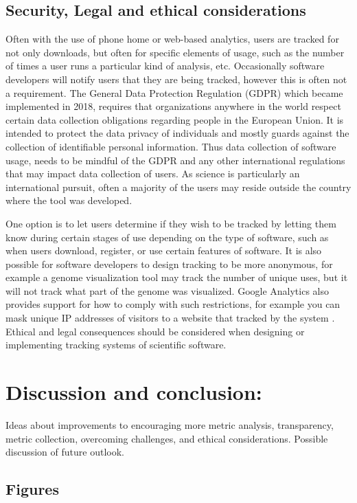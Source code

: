\documentclass{article}
\begin{document}
\subsection{Security, Legal and ethical considerations}\label{sec:legal_ethics}
Often with the use of phone home or web-based analytics, users are tracked for not only downloads, but often for specific elements of usage, such as the number of times a user runs a particular kind of analysis, etc. Occasionally software developers will notify users that they are being tracked, however this is often not a requirement. The General Data Protection Regulation (GDPR) which became implemented in 2018, requires that organizations anywhere in the world respect certain data collection obligations regarding people in the European Union. It is intended to protect the data privacy of individuals and mostly guards against the collection of identifiable personal information. Thus data collection of software usage, needs to be mindful of the GDPR and any other international regulations that may impact data collection of users.  As science is particularly an international pursuit, often a majority of the users may reside outside the country where the tool was developed.

One option is to let users determine if they wish to be tracked by letting them know during certain stages of use depending on the type of software, such as when users download, register, or use certain features 
 of software. It is also possible for software developers to design tracking to be more anonymous, for example a genome visualization tool may track the number of unique uses, but it will not track what part of the genome was visualized. Google Analytics also provides support for how to comply with such restrictions, for example you can  mask unique IP addresses of visitors to a website that tracked by the system \cite{google_analytics_privacy}.  Ethical and legal consequences should be considered when designing or implementing tracking systems of scientific software. 



\section{Discussion and conclusion:}
 Ideas about improvements to encouraging more metric analysis, transparency, metric collection, overcoming challenges, and ethical considerations. Possible discussion of future outlook.
\subsection{Figures}
\end{document}
